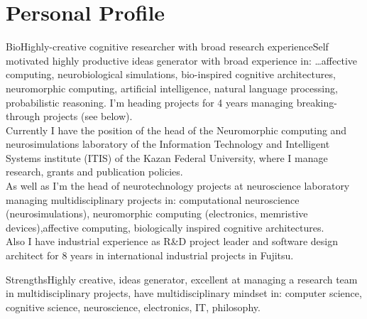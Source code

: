 \documentclass{moderncv}
\begin{document}
%
\makecvtitle

 
\section{Personal Profile}

\cventry
    {Bio}{Highly-creative cognitive researcher with broad research experience}{}{}{}{Self motivated highly productive ideas generator with broad experience in: \ldots affective computing, neurobiological simulations, bio-inspired cognitive architectures, neuromorphic computing, artificial intelligence, natural language processing, probabilistic reasoning. I'm heading projects for 4 years managing breaking-through projects (see below).\\
     Currently I have the position of the head of the Neuromorphic computing and neurosimulations laboratory of the Information Technology and Intelligent Systems institute (ITIS) of the Kazan Federal University, where I manage research, grants and publication policies.\\
     As well as I'm the head of neurotechnology projects at neuroscience laboratory managing multidisciplinary projects in: computational neuroscience (neurosimulations), neuromorphic computing (electronics, memristive devices),affective computing, biologically inspired cognitive architectures.\\
      Also I have industrial experience as R\&D project leader and software design architect for 8 years in international industrial projects in Fujitsu.}

\cvitem
    {Strengths}{\small Highly creative, ideas generator, excellent at managing a research team in multidisciplinary projects, have multidisciplinary mindset in: computer science, cognitive science, neuroscience, electronics, IT, philosophy.}
\end{document}
